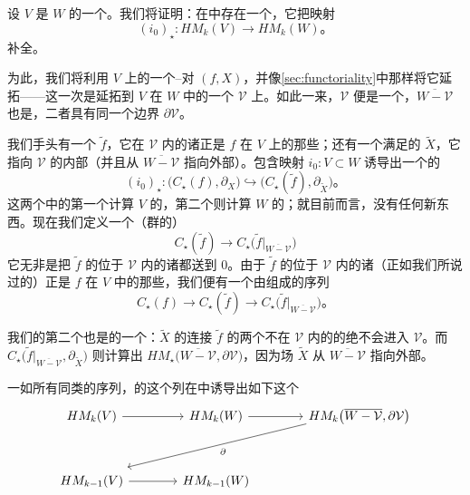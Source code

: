 
\section{\trLongExactSequence}
\label{sec:long-exact-sequence}

设 $V$ 是\trManifold{} $W$ 的一个\trSubmanifold。我们将证明：在\trHomology{}中存在一个\trLongExactSequence，它把映射
\[
(i_0)_\star\colon HM_k(V)\longrightarrow HM_k(W)\text{。}
\]
补全。

为此，我们将利用 $V$ 上的一个\trMorse--\trSmale{}对 $(f,X)$，并像\cref{sec:functoriality}中那样将它延拓——这一次是延拓到 $V$ 在 $W$ 中的一个\trTubularNeighborhood{} $\mathcal{V}$ 上。如此一来，$\mathcal{V}$ 便是一个\trManifoldWithBoundary，$\overline{W-\mathcal{V}}$ 也是，二者具有同一个边界 $\partial\mathcal{V}$。

我们手头有一个\trMorseFunction{} $\widetilde f$，它在 $\mathcal{V}$ 内的诸\trCriticalPoint{}正是 $f$ 在 $V$ 上的那些；还有一个满足\trSmaleCondition{}的\trVectorField{} $\widetilde X$，它指向 $\mathcal{V}$ 的内部（并且从 $\overline{W-\mathcal{V}}$ 指向外部）。包含映射 $i_0\colon V\subset W$ 诱导出一个\trInjective{}的\trComplex\trMorphism
\[
(i_0)_\star\colon\bigl(C_\star(f),\partial_X\bigr)\hookrightarrow
  \bigl(C_\star(\widetilde f),\partial_{\widetilde X}\bigr)\text{。}
\]
这两个\trComplex{}中的第一个计算 $V$ 的\trHomology，第二个则计算 $W$ 的\trHomology；就目前而言，没有任何新东西。现在我们定义一个（群的）\trMorphism
\[
C_\star(\widetilde f)\longrightarrow
  C_\star\bigl(\widetilde f\big|_{\overline{W-\mathcal{V}}}\bigr)
\]
它无非是把 $\widetilde f$ 的位于 $\mathcal{V}$ 内的诸\trCriticalPoint{}都送到 $0$。由于 $\widetilde f$ 的位于 $\mathcal{V}$ 内的诸\trCriticalPoint{}（正如我们所说过的）正是 $f$ 在 $V$ 中的那些，我们便有一个由\trAbelianGroup{}组成的序列
\[
C_\star(f)\longrightarrow C_\star(\widetilde f)\longrightarrow
  C_\star\bigl(\widetilde f\big|_{\overline{W-\mathcal{V}}}\bigr)\text{。}
\]

我们的第二个\trMorphism{}也是\trComplex{}的一个\trMorphism：$\widetilde X$ 的连接 $\widetilde f$ 的两个不在 $\mathcal{V}$ 内的\trCriticalPoint{}的\trTrajectory{}绝不会进入 $\mathcal{V}$。而\trComplex{} $C_\star\bigl(\widetilde f\big|_{\overline{W-\mathcal{V}}},\partial_{\widetilde X}\bigr)$ 则计算出\trHomology{} $HM_\star\bigl(\overline{W-\mathcal{V}},\partial\mathcal{V}\bigr)$，因为场 $\widetilde X$ 从 $\overline{W-\mathcal{V}}$ 指向外部。

一如所有同类的序列，\trComplex{}的这个\trExact{}列在\trHomology{}中诱导出如下这个\trLongExactSequence
\[
\begin{tikzcd}[column sep=1.35cm,row sep=1.15cm]
HM_k(V) \ar[r] & HM_k(W) \ar[r]
  & HM_k\bigl(\overline{W-\mathcal{V}},\partial\mathcal{V}\bigr) \ar[from=1-3,to=2-1,shift right=1.5mm,"\partial"] \\
HM_{k-1}(V) \ar[r] & HM_{k-1}(W)
\end{tikzcd}
\]

